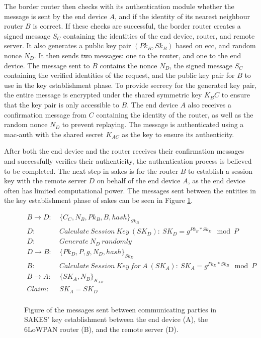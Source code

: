 The border router then checks with its authentication module whether the message is sent by the end device $A$, and if the identity of its nearest neighbour router $B$ is correct. If these checks are successful, the border router creates a signed message $S_C$ containing the identities of the end device, router, and remote server. It also generates a public key pair $(Pk_B, Sk_B)$ based on \gls{ecc}, and random nonce $N_D$. It then sends two messages: one to the router, and one to the end device. The message sent to $B$ contains the nonce $N_D$, the signed message $S_C$ containing the verified identities of the request, and the public key pair for $B$ to use in the key establishment phase. To provide secrecy for the generated key pair, the entire message is encrypted under the shared symmetric key $K_BC$ to ensure that the key pair is only accessible to $B$. The end device $A$ also receives a confirmation message from $C$ containing the identity of the router, as well as the random nonce $N_D$ to prevent replaying. The message is authenticated using a \gls{mac-auth} with the shared secret $K_{AC}$ as the key to ensure its authenticity.

After both the end device and the router receives their confirmation messages and successfully verifies their authenticity, the authentication process is believed to be completed. The next step in \gls{sakes} is for the router $B$ to establish a session key with the remote server $D$ on behalf of the end device $A$, as the end device often has limited computational power. The messages sent between the entities in the key establishment phase of \gls{sakes} can be seen in Figure \ref{fig:sakes-keys}.

\begin{figure}[h]
\begin{tcolorbox}[title=Key Establishment in SAKES]
\begin{align*}
B \rightarrow D:\ & \{C_C, N_B, Pk_B, B, hash\}_{Sk_B} \\
D:\ & Calculate\ Session\ Key\ (SK_D):\ SK_D = g^{Pk_B * Sk_D} \mod{P}\\
D:\ & Generate\ N_D\ randomly\\
D \rightarrow B:\ & \{Pk_D, P, g, N_D, hash\}_{Sk_D}\\
B:\ & Calculate\ Session\ Key\ for\ A\ (SK_A):\ SK_A = g^{Pk_D * Sk_B} \mod{P}\\
B \rightarrow A:\ & \{SK_A, N_B\}_{K_{AB}}\\
Claim:\ & SK_A = SK_D\\
\end{align*}
\end{tcolorbox}
\caption{Figure of the messages sent between communicating parties in SAKES' key establishment between the end device (A), the 6LoWPAN router (B), and the remote server (D).}
\label{fig:sakes-keys}
\end{figure}


